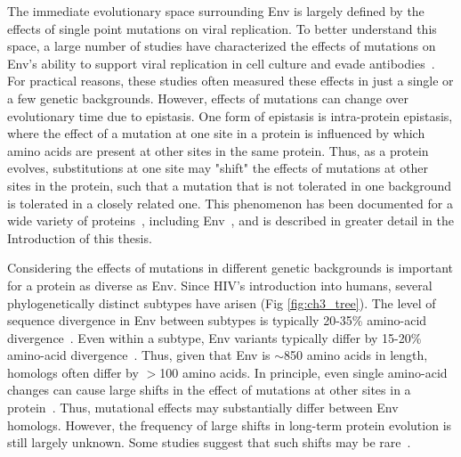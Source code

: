 \documentclass[9pt]{elife}
\begin{document}
The immediate evolutionary space surrounding Env is largely defined by the effects of single point mutations on viral replication.
To better understand this space, a large number of studies have characterized the effects of mutations on Env's ability to support viral replication in cell culture and evade antibodies~\cite{olshevsky1990identification,cordonnier1989single,basmaciogullari2002identification,freed1989mutational,lu2001structural,jacobs2005alanine,zwick2005anti,pantophlet2003fine,li2011mechanism,lynch2015hiv,haddox2016experimental}.
For practical reasons, these studies often measured these effects in just a single or a few genetic backgrounds.
However, effects of mutations can change over evolutionary time due to epistasis.
One form of epistasis is intra-protein epistasis, where the effect of a mutation at one site in a protein is influenced by which amino acids are present at other sites in the same protein.
Thus, as a protein evolves, substitutions at one site may "shift" the effects of mutations at other sites in the protein, such that a mutation that is not tolerated in one background is tolerated in a closely related one.
This phenomenon has been documented for a wide variety of proteins~\cite{weinreich2006darwinian,bloom2006protein,bershtein2006robustness,ortlund2007crystal,lunzer2010pervasive,gong2013stability,natarajan2013epistasis,harms2014historical,podgornaia2015pervasive}, including Env~\cite{freed1994evidence,wang1996single,da2010fitness,gasser2016buffering}, and is described in greater detail in the Introduction of this thesis.

Considering the effects of mutations in different genetic backgrounds is important for a protein as diverse as Env.
Since HIV's introduction into humans, several phylogenetically distinct subtypes have arisen (Fig \ref{fig:ch3_tree}).
The level of sequence divergence in Env between subtypes is typically 20-35\% amino-acid divergence~\cite{korber2001evolutionary}.
Even within a subtype, Env variants typically differ by 15-20\% amino-acid divergence~\cite{korber2001evolutionary}.
Thus, given that Env is $\sim$850 amino acids in length, homologs often differ by $>$100 amino acids.
In principle, even single amino-acid changes can cause large shifts in the effect of mutations at other sites in a protein~\cite{weinreich2006darwinian,ortlund2007crystal,gong2013stability}.
Thus, mutational effects may substantially differ between Env homologs.
However, the frequency of large shifts in long-term protein evolution is still largely unknown.
Some studies suggest that such shifts may be rare~\cite{doud2015site,ashenberg2013mutational}.
\end{document}
